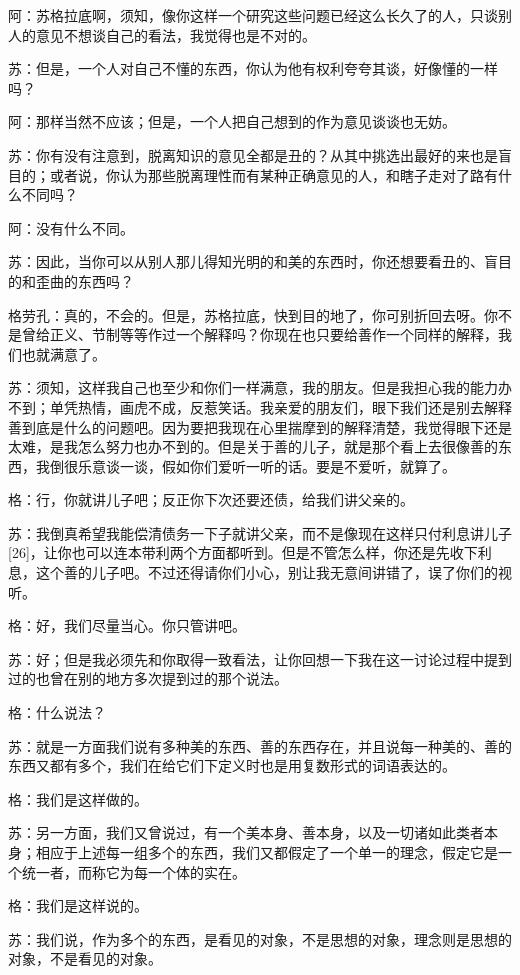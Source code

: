 \documentclass[12pt,oneside]{book}
\begin{document}
阿：苏格拉底啊，须知，像你这样一个研究这些问题已经这么长久了的人，只谈别人的意见不想谈自己的看法，我觉得也是不对的。

苏：但是，一个人对自己不懂的东西，你认为他有权利夸夸其谈，好像懂的一样吗？

阿：那样当然不应该；但是，一个人把自己想到的作为意见谈谈也无妨。

苏：你有没有注意到，脱离知识的意见全都是丑的？从其中挑选出最好的来也是盲目的；或者说，你认为那些脱离理性而有某种正确意见的人，和瞎子走对了路有什么不同吗？

阿：没有什么不同。

苏：因此，当你可以从别人那儿得知光明的和美的东西时，你还想要看丑的、盲目的和歪曲的东西吗？

格劳孔：真的，不会的。但是，苏格拉底，快到目的地了，你可别折回去呀。你不是曾给正义、节制等等作过一个解释吗？你现在也只要给善作一个同样的解释，我们也就满意了。

苏：须知，这样我自己也至少和你们一样满意，我的朋友。但是我担心我的能力办不到；单凭热情，画虎不成，反惹笑话。我亲爱的朋友们，眼下我们还是别去解释善到底是什么的问题吧。因为要把我现在心里揣摩到的解释清楚，我觉得眼下还是太难，是我怎么努力也办不到的。但是关于善的儿子，就是那个看上去很像善的东西，我倒很乐意谈一谈，假如你们爱听一听的话。要是不爱听，就算了。

格：行，你就讲儿子吧；反正你下次还要还债，给我们讲父亲的。

苏：我倒真希望我能偿清债务一下子就讲父亲，而不是像现在这样只付利息讲儿子[26]，让你也可以连本带利两个方面都听到。但是不管怎么样，你还是先收下利息，这个善的儿子吧。不过还得请你们小心，别让我无意间讲错了，误了你们的视听。

格：好，我们尽量当心。你只管讲吧。

苏：好；但是我必须先和你取得一致看法，让你回想一下我在这一讨论过程中提到过的也曾在别的地方多次提到过的那个说法。

格：什么说法？

苏：就是一方面我们说有多种美的东西、善的东西存在，并且说每一种美的、善的东西又都有多个，我们在给它们下定义时也是用复数形式的词语表达的。

格：我们是这样做的。

苏：另一方面，我们又曾说过，有一个美本身、善本身，以及一切诸如此类者本身；相应于上述每一组多个的东西，我们又都假定了一个单一的理念，假定它是一个统一者，而称它为每一个体的实在。

格：我们是这样说的。

苏：我们说，作为多个的东西，是看见的对象，不是思想的对象，理念则是思想的对象，不是看见的对象。
\end{document}

